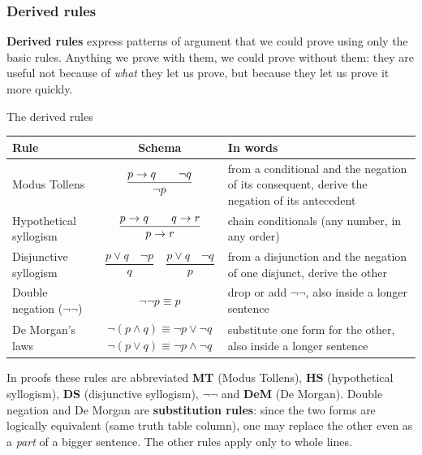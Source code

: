 \subsubsection{Derived rules}

\textbf{Derived rules} express patterns of argument that we could prove using only the basic
rules. Anything we prove with them, we could prove without them: they are useful not
because of \emph{what} they let us prove, but because they let us prove it more quickly.

\begin{nbfact}{The derived rules}
\begin{center}
\renewcommand{\arraystretch}{2.6}
\begin{tabularx}{\linewidth}{@{}l c X@{}}
\toprule
\textbf{Rule} & \textbf{Schema} & \textbf{In words} \\
\midrule
Modus Tollens & $\dfrac{p \rightarrow q \qquad \neg q}{\neg p}$ & from a conditional and the negation of its consequent, derive the negation of its antecedent \\
Hypothetical syllogism & $\dfrac{p \rightarrow q \qquad q \rightarrow r}{p \rightarrow r}$ & chain conditionals (any number, in any order) \\
Disjunctive syllogism & $\dfrac{p \lor q \quad \neg p}{q} \quad \dfrac{p \lor q \quad \neg q}{p}$ & from a disjunction and the negation of one disjunct, derive the other \\
Double negation ($\neg\neg$) & $\neg\neg p \equiv p$ & drop or add $\neg\neg$, also inside a longer sentence \\
De Morgan's laws & $\begin{array}{c}\neg(p \land q) \equiv \neg p \lor \neg q \\ \neg(p \lor q) \equiv \neg p \land \neg q\end{array}$ & substitute one form for the other, also inside a longer sentence \\
\bottomrule
\end{tabularx}
\end{center}
In proofs these rules are abbreviated \textbf{MT} (Modus Tollens), \textbf{HS} (hypothetical
syllogism), \textbf{DS} (disjunctive syllogism), $\neg\neg$ and \textbf{DeM} (De Morgan).
Double negation and De Morgan are \textbf{substitution rules}: since the two forms are
logically equivalent (same truth table column), one may replace the other even as a
\emph{part} of a bigger sentence. The other rules apply only to whole lines.
\end{nbfact}

